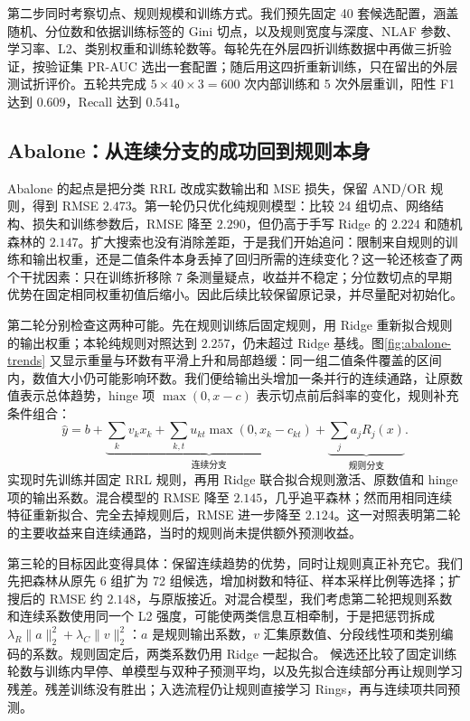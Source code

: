 \documentclass[UTF8,a4paper,11pt]{ctexart}
\begin{document}
第二步同时考察切点、规则规模和训练方式。我们预先固定 40 套候选配置，涵盖随机、分位数和依据训练标签的 Gini 切点，以及规则宽度与深度、NLAF 参数、学习率、L2、类别权重和训练轮数等。每轮先在外层四折训练数据中再做三折验证，按验证集 PR-AUC 选出一套配置；随后用这四折重新训练，只在留出的外层测试折评价。五轮共完成 $5\times40\times3=600$ 次内部训练和 5 次外层重训，阳性 F1 达到 $0.609$，Recall 达到 $0.541$。



\subsection{Abalone：从连续分支的成功回到规则本身}

Abalone 的起点是把分类 RRL 改成实数输出和 MSE 损失，保留 AND/OR 规则，得到 RMSE $2.473$。第一轮仍只优化纯规则模型：比较 24 组切点、网络结构、损失和训练参数后，RMSE 降至 $2.290$，但仍高于手写 Ridge 的 $2.224$ 和随机森林的 $2.147$。扩大搜索也没有消除差距，于是我们开始追问：限制来自规则的训练和输出权重，还是二值条件本身丢掉了回归所需的连续变化？这一轮还核查了两个干扰因素：只在训练折移除 7 条测量疑点，收益并不稳定；分位数切点的早期优势在固定相同权重初值后缩小。因此后续比较保留原记录，并尽量配对初始化。

第二轮分别检查这两种可能。先在规则训练后固定规则，用 Ridge 重新拟合规则的输出权重；本轮纯规则对照达到 $2.257$，仍未超过 Ridge 基线。图\ref{fig:abalone-trends} 又显示重量与环数有平滑上升和局部趋缓：同一组二值条件覆盖的区间内，数值大小仍可能影响环数。我们便给输出头增加一条并行的连续通路，让原数值表示总体趋势，hinge 项 $\max(0,x-c)$ 表示切点前后斜率的变化，规则补充条件组合：
\begin{equation}
\hat y=b+\underbrace{\sum_kv_kx_k+\sum_{k,t}u_{kt}\max(0,x_k-c_{kt})}_{\text{连续分支}}
       +\underbrace{\sum_ja_jR_j(x)}_{\text{规则分支}}.
\label{eq:mixed}
\end{equation}
实现时先训练并固定 RRL 规则，再用 Ridge 联合拟合规则激活、原数值和 hinge 项的输出系数。混合模型的 RMSE 降至 $2.145$，几乎追平森林；然而用相同连续特征重新拟合、完全去掉规则后，RMSE 进一步降至 $2.124$。这一对照表明第二轮的主要收益来自连续通路，当时的规则尚未提供额外预测收益。

第三轮的目标因此变得具体：保留连续趋势的优势，同时让规则真正补充它。我们先把森林从原先 6 组扩为 72 组候选，增加树数和特征、样本采样比例等选择；扩搜后的 RMSE 约 $2.148$，与原版接近。对混合模型，我们考虑第二轮把规则系数和连续系数使用同一个 L2 强度，可能使两类信息互相牵制，于是把惩罚拆成 $\lambda_R\|a\|_2^2+\lambda_C\|v\|_2^2$：$a$ 是规则输出系数，$v$ 汇集原数值、分段线性项和类别编码的系数。规则固定后，两类系数仍用 Ridge 一起拟合。
候选还比较了固定训练轮数与训练内早停、单模型与双种子预测平均，以及先拟合连续部分再让规则学习残差。残差训练没有胜出；入选流程仍让规则直接学习 Rings，再与连续项共同预测。
\end{document}
